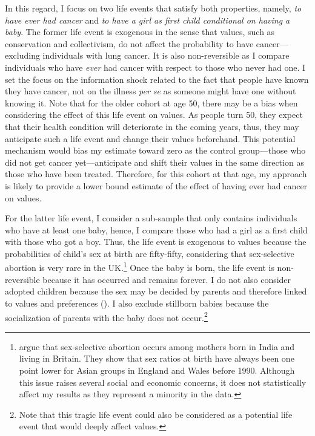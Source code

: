 In this regard, I focus on two life events that satisfy both properties, namely, \textit{to have ever had cancer} and \textit{to have a girl as first child conditional on having a baby}.
%
The former life event is exogenous in the sense that values, such as conservation and collectivism, do not affect the probability to have cancer---excluding individuals with lung cancer. It is also non-reversible as I compare individuals who have \textit{ever} had cancer with respect to those who never had one. I set the focus on the information shock related to the fact that people have known they have cancer, not on the illness \textit{per se} as someone might have one without knowing it.
Note that for the older cohort at age 50, there may be a bias when considering the effect of this life event on values. As people turn 50, they expect that their health condition will deteriorate in the coming years, thus, they may anticipate such a life event and change their values beforehand. This potential mechanism would bias my estimate toward zero as the control group---those who did not get cancer yet---anticipate and shift their values in the same direction as those who have been treated. Therefore, for this cohort at that age, my approach is likely to provide a lower bound estimate of the effect of having ever had cancer on values.

For the latter life event, I consider a sub-sample that only contains individuals who have at least one baby, hence, I compare those who had a girl as a first child with those who got a boy.
Thus, the life event is exogenous to values because the probabilities of child's sex at birth are fifty-fifty, considering that sex‐selective abortion is very rare in the UK.\footnote{
\citet{Dubuc2007Increase} argue that sex-selective abortion occurs among mothers born in India and living in Britain. They show that sex ratios at birth have always been one point lower for Asian groups in England and Wales before 1990. Although this issue raises several social and economic concerns, it does not statistically affect my results as they represent a minority in the data.} Once the baby is born, the life event is non-reversible because it has occurred and remains forever.
I do not also consider adopted children because the sex may be decided by parents and therefore linked to values and preferences (\citealt{Dahl2008Demand}). I also exclude stillborn babies because the socialization of parents with the baby does not occur.\footnote{Note that this tragic life event could also be considered as a potential life event that would deeply affect values.}

